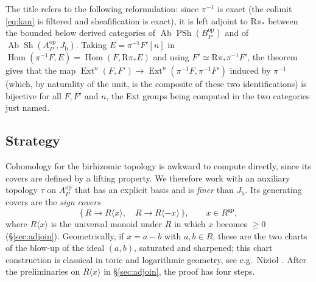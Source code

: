 \documentclass[11pt]{article}
\newcommand{\gp}{\mathrm{gp}}
\newcommand{\Hom}{\operatorname{Hom}}
\newcommand{\Sh}{\operatorname{Sh}}
\newcommand{\PSh}{\operatorname{PSh}}
\newcommand{\Ab}{\operatorname{Ab}}
\newcommand{\R}{\mathrm R}
\newcommand{\Jb}{J_{\mathrm b}}
\theoremstyle{definition}
\theoremstyle{remark}
\begin{document}
The title refers to the following reformulation: since \(\pi^{-1}\) is
exact (the colimit \eqref{eq:kan} is filtered and sheafification is exact),
it is left adjoint to \(\R\pi_*\) between the bounded below derived
categories of \(\Ab\PSh(B_P^{\mathrm{op}})\) and of
\(\Ab\Sh(A_P^{\mathrm{op}},\Jb)\).  Taking \(E=\pi^{-1}F'[n]\) in
\(\Hom(\pi^{-1}F,E)=\Hom(F,\R\pi_*E)\) and using
\(F'\simeq\R\pi_*\pi^{-1}F'\), the theorem gives that the map
\(\operatorname{Ext}^n(F,F')\to\operatorname{Ext}^n(\pi^{-1}F,\pi^{-1}F')\)
induced by \(\pi^{-1}\) (which, by naturality of the unit, is the
composite of these two identifications) is bijective for all \(F,F'\) and
\(n\), the Ext groups being computed in the two categories just named.

\subsection{Strategy}

Cohomology for the birhizomic topology is awkward to compute directly, since
its covers are defined by a lifting property.  We therefore work with an
auxiliary topology \(\tau\) on \(A_P^{\mathrm{op}}\) that has an explicit
basis and is \emph{finer} than \(\Jb\).  Its generating covers are the
\emph{sign covers}
\[
   \{\,R\to R\langle x\rangle,\quad R\to R\langle -x\rangle\,\},
   \qquad x\in R^{\gp},
\]
where \(R\langle x\rangle\) is the universal monoid under \(R\) in which
\(x\) becomes \(\ge0\) (\S\ref{sec:adjoin}).  Geometrically, if \(x=a-b\) with
\(a,b\in R\), these are the two charts of the blow-up of the ideal
\((a,b)\), saturated and sharpened; this chart construction is classical in
toric and logarithmic geometry, see e.g.\ Nizio{\l} \cite[\S4]{niziol}.
After the preliminaries on \(R\langle x\rangle\) in \S\ref{sec:adjoin},
the proof has four steps.
\end{document}
